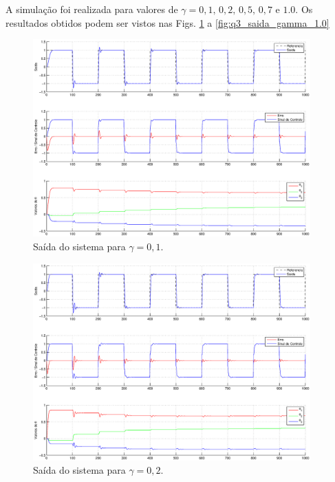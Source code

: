A simulação foi realizada para valores de $\gamma = 0,1\text{, } 0,2\text{, }
0,5\text{, } 0,7 \text{ e } 1.0$. Os resultados obtidos podem ser vistos nas
Figs. \ref{fig:q3_saida_gamma_0.1} a \ref{fig:q3_saida_gamma_1.0}

\begin{figure}[htb]
    \centering
    \includegraphics[width=0.95\textwidth]{imgs/questao3/saida_gamma_0.1.eps}
    \caption{Saída do sistema para $\gamma = 0,1$.}
    \label{fig:q3_saida_gamma_0.1}
\end{figure}

\begin{figure}[htb]
    \centering
    \includegraphics[width=0.95\textwidth]{imgs/questao3/saida_gamma_0.2.eps}
    \caption{Saída do sistema para $\gamma = 0,2$.}
    \label{fig:q3_saida_gamma_0.2}
\end{figure}


